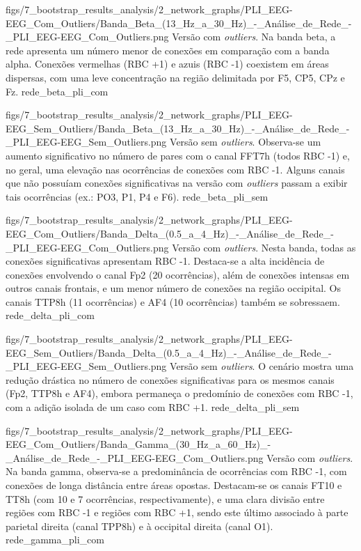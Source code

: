 \smallfigure
{figs/7_bootstrap_results_analysis/2_network_graphs/PLI_EEG-EEG_Com_Outliers/Banda_Beta_(13_Hz_a_30_Hz)_-_Análise_de_Rede_-_PLI_EEG-EEG_Com_Outliers.png}
{Versão com \textit{outliers}. Na banda beta, a rede apresenta um número menor de conexões em comparação com a banda alpha. Conexões vermelhas (RBC +1) e azuis (RBC -1) coexistem em áreas dispersas, com uma leve concentração na região delimitada por F5, CP5, CPz e Fz.}
{rede_beta_pli_com}

\smallfigure
{figs/7_bootstrap_results_analysis/2_network_graphs/PLI_EEG-EEG_Sem_Outliers/Banda_Beta_(13_Hz_a_30_Hz)_-_Análise_de_Rede_-_PLI_EEG-EEG_Sem_Outliers.png}
{Versão sem \textit{outliers}. Observa-se um aumento significativo no número de pares com o canal FFT7h (todos RBC -1) e, no geral, uma elevação nas ocorrências de conexões com RBC -1. Alguns canais que não possuíam conexões significativas na versão com \textit{outliers} passam a exibir tais ocorrências (ex.: PO3, P1, P4 e F6).}
{rede_beta_pli_sem}

\smallfigure
{figs/7_bootstrap_results_analysis/2_network_graphs/PLI_EEG-EEG_Com_Outliers/Banda_Delta_(0.5_a_4_Hz)_-_Análise_de_Rede_-_PLI_EEG-EEG_Com_Outliers.png}
{Versão com \textit{outliers}. Nesta banda, todas as conexões significativas apresentam RBC -1. Destaca-se a alta incidência de conexões envolvendo o canal Fp2 (20 ocorrências), além de conexões intensas em outros canais frontais, e um menor número de conexões na região occipital. Os canais TTP8h (11 ocorrências) e AF4 (10 ocorrências) também se sobressaem.}
{rede_delta_pli_com}

\smallfigure
{figs/7_bootstrap_results_analysis/2_network_graphs/PLI_EEG-EEG_Sem_Outliers/Banda_Delta_(0.5_a_4_Hz)_-_Análise_de_Rede_-_PLI_EEG-EEG_Sem_Outliers.png}
{Versão sem \textit{outliers}. O cenário mostra uma redução drástica no número de conexões significativas para os mesmos canais (Fp2, TTP8h e AF4), embora permaneça o predomínio de conexões com RBC -1, com a adição isolada de um caso com RBC +1.}
{rede_delta_pli_sem}

\smallfigure
{figs/7_bootstrap_results_analysis/2_network_graphs/PLI_EEG-EEG_Com_Outliers/Banda_Gamma_(30_Hz_a_60_Hz)_-_Análise_de_Rede_-_PLI_EEG-EEG_Com_Outliers.png}
{Versão com \textit{outliers}. Na banda gamma, observa-se a predominância de ocorrências com RBC -1, com conexões de longa distância entre áreas opostas. Destacam-se os canais FT10 e TT8h (com 10 e 7 ocorrências, respectivamente), e uma clara divisão entre regiões com RBC -1 e regiões com RBC +1, sendo este último associado à parte parietal direita (canal TPP8h) e à occipital direita (canal O1).}
{rede_gamma_pli_com}

